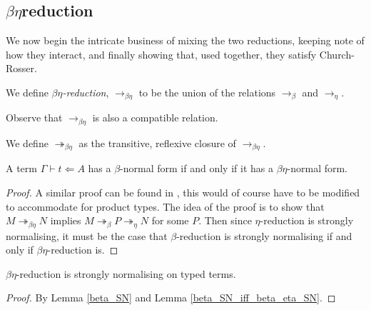 
\subsection{\texorpdfstring{$\beta \eta$}-reduction}

We now begin the intricate business of mixing the two reductions, keeping note of how they interact, and finally showing that, used together, they satisfy Church-Rosser.

\begin{defin}
    We define \emph{$\beta\eta$-reduction}, $\to_{\beta\eta}$ to be the union of the relations $\to_\beta$ and $\to_\eta$.
\end{defin}

\begin{remark}
    Observe that $\to_{\beta\eta}$ is also a compatible relation.
\end{remark}

\begin{defin}
    We define $\twoheadrightarrow_{\beta\eta}$ as the transitive, reflexive closure of $\to_{\beta\eta}$.
\end{defin}

\begin{lemma}\label{beta_SN_iff_beta_eta_SN}
    A term $\Gamma \vdash t \Leftarrow A$ has a $\beta$-normal form if and only if it has a $\beta \eta$-normal form.
\end{lemma}

\begin{proof}
    A similar proof can be found in \cite[Corollary 15.1.5]{barendregt1984lambda}, this would of course have to be modified to accommodate for product types. The idea of the proof is to show that $M \twoheadrightarrow_{\beta\eta} N$ implies $M \twoheadrightarrow_{\beta} P \twoheadrightarrow_{\eta} N$ for some $P$. Then since $\eta$-reduction is strongly normalising, it must be the case that $\beta$-reduction is strongly normalising if and only if $\beta \eta$-reduction is.
\end{proof}

\begin{cor}\label{beta_eta_SN}
    $\beta \eta$-reduction is strongly normalising on typed terms.
\end{cor}

\begin{proof}
    By Lemma \ref{beta_SN} and Lemma \ref{beta_SN_iff_beta_eta_SN}.
\end{proof}

